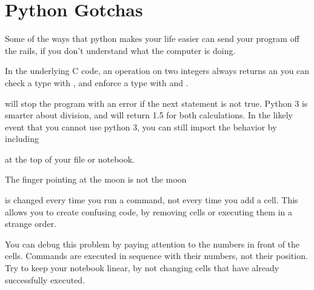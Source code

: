 \documentclass[justified, nobib]{tufte-handout}
\begin{document}
\section*{Python Gotchas}
Some of the ways that python makes your life easier can send your program off
the rails, if you don't understand what the computer is doing.


\vspace{5mm}


\noindent
In the underlying C code, an operation on two integers always returns an
you can check a type with , and enforce a
type with  and .



 will stop the program with an error if the next
statement is not true.
Python 3 is smarter about division, and will return 1.5 for both calculations.
In the likely event that you cannot use python 3, you can still
import the behavior by including



at the top of your file or notebook.

\begin{marginfigure}
    \vspace*{\fill}
    \centering
    \subfloat[Case 1]{\scalebox{1}{}}

    \vfill

    \subfloat[Case 2]{\scalebox{0.69}{}}
  \caption{The finger pointing at the moon is not the moon}
\label{fig:copy}
\end{marginfigure}

\smallskip
\noindent{
    
}

 is changed every time you run a command, not
every time you add a cell. This allows you to create confusing code, by removing
cells or executing them in a strange order.



\noindent
You can debug this problem by paying attention to the numbers in front of the
cells. Commands are executed in sequence with their numbers, not their
position. Try to keep your notebook linear, by not changing cells that have
already successfully executed.
\end{document}
